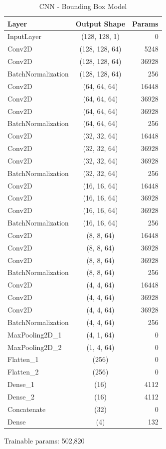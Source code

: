 \documentclass[paper=a4, fontsize=11pt]{scrartcl}
\numberwithin{equation}{section}		%
\numberwithin{table}{section}				%
\begin{document}
\begin{table}[h!]
  \begin{center}
    \caption{CNN - Bounding Box Model}
    \label{tab:table1}
    \begin{tabular}{l|c|r} %
      \textbf{Layer} & \textbf{Output Shape} & \textbf{Params}\\
      \hline
      InputLayer & (128, 128, 1) & 0\\
      Conv2D & (128, 128, 64) & 5248\\
      Conv2D & (128, 128, 64) & 36928\\
      BatchNormalization & (128, 128, 64) & 256\\
      Conv2D & (64, 64, 64) & 16448\\
      Conv2D & (64, 64, 64) & 36928\\
      Conv2D & (64, 64, 64) & 36928\\
      BatchNormalization & (64, 64, 64) & 256\\
      Conv2D & (32, 32, 64) & 16448\\
      Conv2D & (32, 32, 64) & 36928\\
      Conv2D & (32, 32, 64) & 36928\\
      BatchNormalization & (32, 32, 64) & 256\\
      Conv2D & (16, 16, 64) & 16448\\
      Conv2D & (16, 16, 64) & 36928\\
      Conv2D & (16, 16, 64) & 36928\\
      BatchNormalization & (16, 16, 64) & 256\\
      Conv2D & (8, 8, 64) & 16448\\
      Conv2D & (8, 8, 64) & 36928\\
      Conv2D & (8, 8, 64) & 36928\\
      BatchNormalization & (8, 8, 64) & 256\\
      Conv2D & (4, 4, 64) & 16448\\
      Conv2D & (4, 4, 64) & 36928\\
      Conv2D & (4, 4, 64) & 36928\\
      BatchNormalization & (4, 4, 64) & 256\\
      MaxPooling2D\_1 & (4, 1, 64) & 0\\
      MaxPooling2D\_2 & (1, 4, 64) & 0\\
      Flatten\_1 & (256) & 0\\
      Flatten\_2 & (256) & 0\\
      Dense\_1 & (16) & 4112\\
      Dense\_2 & (16) & 4112\\
      Concatenate & (32) & 0\\
      Dense & (4) & 132\\
    \end{tabular}
      \small
      \item Trainable params: 502,820
  \end{center}
\end{table}
\end{document}
